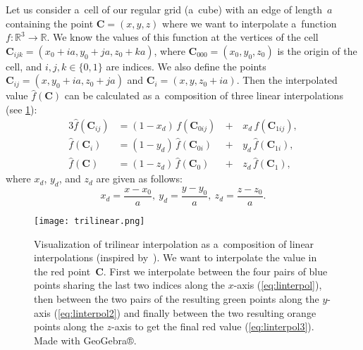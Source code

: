 				Let us consider a~cell of our regular grid (a~cube) with an edge of length~$a$ containing the point $\mathbf{C} = (x,y,z)$ where we want to interpolate a~function $f\colon\mathbb{R}^3\to\mathbb{R}$. We know the values of this function at the vertices of the cell $\mathbf{C}_{ijk} = (x_0+ia,y_0+ja,z_0+ka)$, where $\mathbf{C}_{000} = (x_0,y_0,z_0)$ is the origin of the cell, and $i,j,k \in \{0,1\}$ are indices. We also define the points $\mathbf{C}_{ij} = (x,y_0+ia,z_0+ja)$ and $\mathbf{C}_i=(x,y,z_0+ia)$. Then the interpolated value $\widehat{f}(\mathbf{C})$ can be calculated as a~composition of three linear interpolations (see \cref{fig:trilin}):
					\begin{alignat}{3}
						\label{eq:linterpol}
						\widehat{f}(\mathbf{C}_{ij}) &= (1-x_d)\,f(\mathbf{C}_{0ij}) \,&+&\,x_d\, f(\mathbf{C}_{1ij}),\\
						\label{eq:linterpol2}
						\widehat{f}(\mathbf{C}_{i}) &= (1-y_d)\,\widehat{f}(\mathbf{C}_{0i}) &+&\,y_d\, \widehat{f}(\mathbf{C}_{1i}),\\
						\label{eq:linterpol3}
						\widehat{f}(\mathbf{C}) &= (1-z_d)\,\widehat{f}(\mathbf{C}_0) &+&\,z_d\, \widehat{f}(\mathbf{C}_1),
					\end{alignat}
				where $x_d$, $y_d$, and $z_d$ are given as follows:
					\begin{equation}
						x_d = \frac{x-x_0}{a},~y_d = \frac{y-y_0}{a},~z_d = \frac{z-z_0}{a}.
					\end{equation}
					
				\begin{figure}
					\centering
					\texttt{[image: trilinear.png]}
					\caption{Visualization of trilinear interpolation as a~composition of linear interpolations (inspired by~\cite{trilinear1}). We want to interpolate the value in the red point~$\mathbf{C}$. First we interpolate between the four pairs of blue points sharing the last two indices along the $x$\protect\nobreakdash-axis (\cref{eq:linterpol}), then between the two pairs of the resulting green points along the $y$\protect\nobreakdash-axis (\cref{eq:linterpol2}) and finally between the two resulting orange points along the $z$\protect\nobreakdash-axis to get the final red value (\cref{eq:linterpol3}). Made with GeoGebra®.}
					\label{fig:trilin}
				\end{figure}
					
